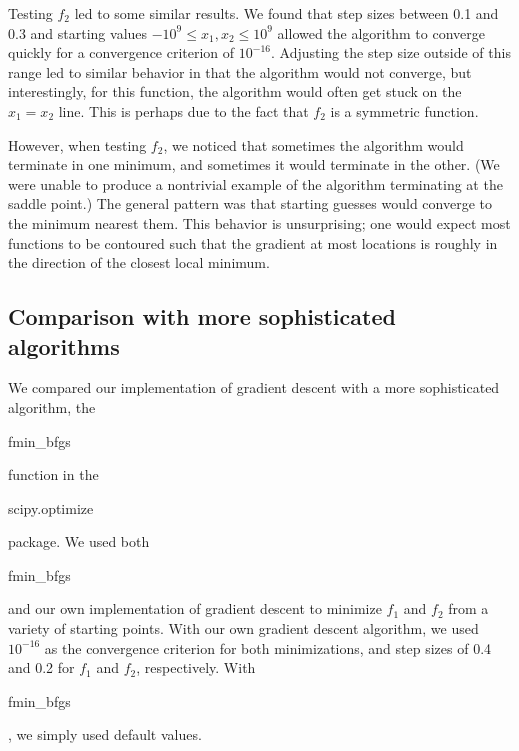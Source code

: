 \documentclass{article}
\begin{document}
Testing $f_2$ led to some similar results. We found that step sizes between 0.1 and 0.3 and starting values $-10^{9} \le x_1, x_2 \le 10^9$ allowed the algorithm to converge quickly for a convergence criterion of $10^{-16}$. Adjusting the step size outside of this range led to similar behavior in that the algorithm would not converge, but interestingly, for this function, the algorithm would often get stuck on the $x_1 = x_2$ line. This is perhaps due to the fact that $f_2$ is a symmetric function. 

However, when testing $f_2$, we noticed that sometimes the algorithm would terminate in one minimum, and sometimes it would terminate in the other. (We were unable to produce a nontrivial example of the algorithm terminating at the saddle point.) The general pattern was that starting guesses would converge to the minimum nearest them. This behavior is unsurprising; one would expect most functions to be contoured such that the gradient at most locations is roughly in the direction of the closest local minimum.

\subsection{Comparison with more sophisticated algorithms}
We compared our implementation of gradient descent with a more sophisticated algorithm, the \begin{tt}fmin\_bfgs\end{tt} function in the \begin{tt}scipy.optimize\end{tt} package. We used both \begin{tt}fmin\_bfgs\end{tt} and our own implementation of gradient descent to minimize $f_1$ and $f_2$ from a variety of starting points. With our own gradient descent algorithm, we used $10^{-16}$ as the convergence criterion for both minimizations, and step sizes of 0.4 and 0.2 for $f_1$ and $f_2$, respectively. With \begin{tt}fmin\_bfgs\end{tt}, we simply used default values.
\end{document}
